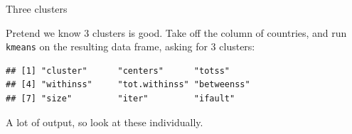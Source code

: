 \documentclass[ignorenonframetext,]{beamer}
\newenvironment{Shaded}{\begin{snugshade}}{\end{snugshade}}
\newcommand{\DecValTok}[1]{\textcolor[rgb]{0.00,0.00,0.81}{#1}}
\newcommand{\KeywordTok}[1]{\textcolor[rgb]{0.13,0.29,0.53}{\textbf{#1}}}
\newcommand{\NormalTok}[1]{#1}
\newcommand{\OperatorTok}[1]{\textcolor[rgb]{0.81,0.36,0.00}{\textbf{#1}}}
\newcommand{\StringTok}[1]{\textcolor[rgb]{0.31,0.60,0.02}{#1}}
\begin{document}
\begin{frame}[fragile]{Three clusters}
\protect\hypertarget{three-clusters}{}

Pretend we know 3 clusters is good. Take off the column of countries,
and run \texttt{kmeans} on the resulting data frame, asking for 3
clusters:

\begin{Shaded}
\end{Shaded}

\begin{verbatim}
## [1] "cluster"      "centers"      "totss"       
## [4] "withinss"     "tot.withinss" "betweenss"   
## [7] "size"         "iter"         "ifault"
\end{verbatim}

A lot of output, so look at these individually.

\end{frame}
\end{document}
